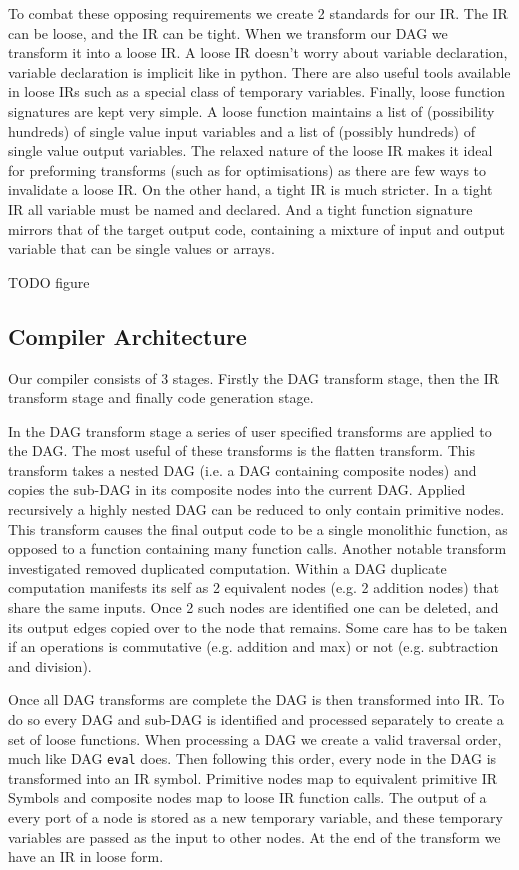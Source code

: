 To combat these opposing requirements we create 2 standards for our IR.
The IR can be loose, and the IR can be tight.
When we transform our DAG we transform it into a loose IR.
A loose IR doesn't worry about variable declaration, variable declaration is implicit like in python.
There are also useful tools available in loose IRs such as a special class of temporary variables.
Finally, loose function signatures are kept very simple.
A loose function maintains a list of (possibility hundreds) of single value input variables and a list of (possibly hundreds) of single value output variables.
The relaxed nature of the loose IR makes it ideal for preforming transforms (such as for optimisations) as there are few ways to invalidate a loose IR.
On the other hand, a tight IR is much stricter.
In a tight IR all variable must be named and declared.
And a tight function signature mirrors that of the target output code, containing a mixture of input and output variable that can be single values or arrays.

TODO figure

\subsection{Compiler Architecture}
Our compiler consists of 3 stages.
Firstly the DAG transform stage, then the IR transform stage and finally code generation stage.

In the DAG transform stage a series of user specified transforms are applied to the DAG.
The most useful of these transforms is the flatten transform.
This transform takes a nested DAG (i.e. a DAG containing composite nodes) and copies the sub-DAG in its composite nodes into the current DAG.
Applied recursively a highly nested DAG can be reduced to only contain primitive nodes.
This transform causes the final output code to be a single monolithic function, as opposed to a function containing many function calls.
Another notable transform investigated removed duplicated computation.
Within a DAG duplicate computation manifests its self as 2 equivalent nodes (e.g. 2 addition nodes) that share the same inputs.
Once 2 such nodes are identified one can be deleted, and its output edges copied over to the node that remains.
Some care has to be taken if an operations is commutative (e.g. addition and max) or not (e.g. subtraction and division).

Once all DAG transforms are complete the DAG is then transformed into IR.
To do so every DAG and sub-DAG is identified and processed separately to create a set of loose functions.
When processing a DAG we create a valid traversal order, much like DAG \texttt{eval} does.
Then following this order, every node in the DAG is transformed into an IR symbol.
Primitive nodes map to equivalent primitive IR Symbols and composite nodes map to loose IR function calls.
The output of a every port of a node is stored as a new temporary variable, and these temporary variables are passed as the input to other nodes.
At the end of the transform we have an IR in loose form.

